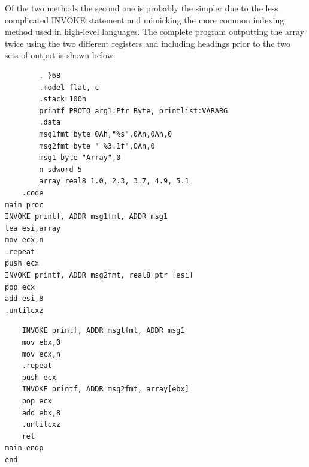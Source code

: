\documentclass[10pt]{book}
\begin{document}
Of the two methods the second one is probably the simpler due to the less complicated INVOKE statement and mimicking the more common indexing method used in high-level languages. The complete program outputting the array twice using the two different registers and including headings prior to the two sets of output is shown below:

\begin{verbatim}
        . }68
        .model flat, c
        .stack 100h
        printf PROTO arg1:Ptr Byte, printlist:VARARG
        .data
        msg1fmt byte 0Ah,"%s",0Ah,0Ah,0
        msg2fmt byte " %3.1f",OAh,0
        msg1 byte "Array",0
        n sdword 5
        array real8 1.0, 2.3, 3.7, 4.9, 5.1
    .code
main proc
INVOKE printf, ADDR msg1fmt, ADDR msg1
lea esi,array
mov ecx,n
.repeat
push ecx
INVOKE printf, ADDR msg2fmt, real8 ptr [esi]
pop ecx
add esi,8
.untilcxz
\end{verbatim}

\begin{verbatim}
    INVOKE printf, ADDR msglfmt, ADDR msg1
    mov ebx,0
    mov ecx,n
    .repeat
    push ecx
    INVOKE printf, ADDR msg2fmt, array[ebx]
    pop ecx
    add ebx,8
    .untilcxz
    ret
main endp
end
\end{verbatim}
\end{document}
